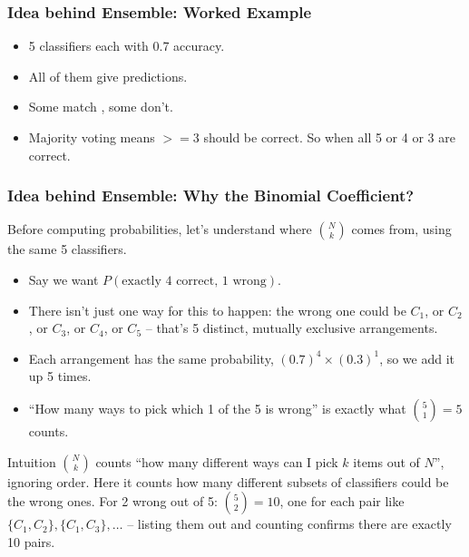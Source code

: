 \begin{frame}[fragile]\frametitle{Idea behind Ensemble: Worked Example}
\begin{itemize}
\item 5 classifiers each with 0.7 accuracy.
\item All of them give predictions.
\item Some match , some don't.
\item Majority voting means $>= 3$ should be correct. So when all 5 or 4 or 3 are correct.
\end{itemize}

\begin{center}
\end{center}


\end{frame}

\begin{frame}[fragile]\frametitle{Idea behind Ensemble: Why the Binomial Coefficient?}
Before computing probabilities, let's understand where ${N \choose k}$ comes from, using the same 5 classifiers.
\begin{itemize}
\item Say we want $P(\text{exactly 4 correct, 1 wrong})$.
\item There isn't just one way for this to happen: the wrong one could be $C_1$, or $C_2$, or $C_3$, or $C_4$, or $C_5$ -- that's 5 distinct, mutually exclusive arrangements.
\item Each arrangement has the same probability, $(0.7)^4 \times (0.3)^1$, so we add it up 5 times.
\item ``How many ways to pick which 1 of the 5 is wrong'' is exactly what ${5 \choose 1} = 5$ counts.
\end{itemize}
\begin{block}{Intuition}
${N \choose k}$ counts ``how many different ways can I pick $k$ items out of $N$'', ignoring order. Here it counts how many different subsets of classifiers could be the wrong ones. For 2 wrong out of 5: ${5 \choose 2} = 10$, one for each pair like $\{C_1,C_2\}, \{C_1,C_3\}, \ldots$ -- listing them out and counting confirms there are exactly 10 pairs.
\end{block}
\end{frame}

